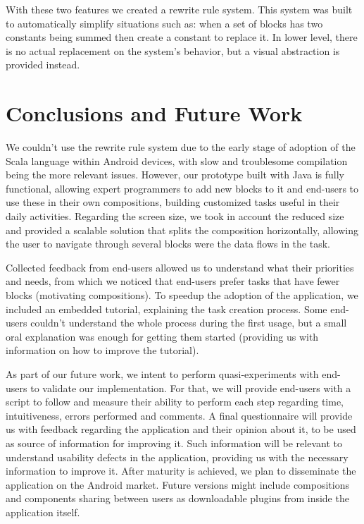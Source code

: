 \documentclass[9pt,a4paper]{extarticle}
\begin{document}
\begin{multicols}{2}
With these two features we created a rewrite rule system. This system was built to automatically simplify situations such as: when a set of blocks has two constants being summed then create a constant to replace it. In lower level, there is no actual replacement on the system's behavior, but a visual abstraction is provided instead. 

\section{Conclusions and Future Work}\label{sec:conclui}

We couldn't use the rewrite rule system due to the early stage of adoption of the Scala language within Android devices, with slow and troublesome compilation being the more relevant issues. However, our prototype built with Java is fully functional, allowing expert programmers to add new blocks to it and end-users to use these in their own compositions, building customized tasks useful in their daily activities. Regarding the screen size, we took in account the reduced size and provided a scalable solution that splits the composition horizontally, allowing the user to navigate through several blocks were the data flows in the task. 

Collected feedback from end-users allowed us to understand what their priorities and needs, from which we noticed that end-users prefer tasks that have fewer blocks (motivating compositions). To speedup the adoption of the application, we included an embedded tutorial, explaining the task creation process. Some end-users couldn't understand the whole process during the first usage, but a small oral explanation was enough for getting them started (providing us with information on how to improve the tutorial).

As part of our future work, we intent to perform quasi-experiments with end-users to validate our implementation. For that, we will provide end-users with a script to follow and measure their ability to perform each step regarding time, intuitiveness, errors performed and comments. A final questionnaire will provide us with feedback regarding the application and their opinion about it, to be used as source of information for improving it. Such information will be relevant to understand usability defects in the application, providing us with the necessary information to improve it. After maturity is achieved, we plan to disseminate the application on the Android market. Future versions might include compositions and components sharing between users as downloadable plugins from inside the application itself.



\end{multicols}
\end{document}
